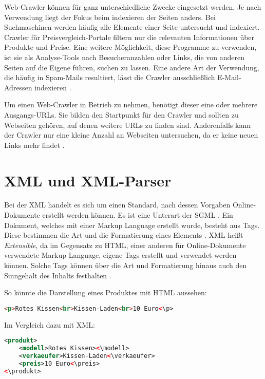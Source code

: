 Web-Crawler können für ganz unterschiedliche Zwecke eingesetzt werden. Je nach Verwendung liegt der Fokus beim indexieren der Seiten anders. Bei Suchmaschinen werden häufig alle Elemente einer Seite untersucht und indexiert. Crawler für Preisvergleich-Portale filtern nur die relevanten Informationen über Produkte und Preise. Eine weitere Möglichkeit, diese Programme zu verwenden, ist sie als Analyse-Tools nach Besucheranzahlen oder Links, die von anderen Seiten auf die Eigene führen, suchen zu lassen. Eine andere Art der Verwendung, die häufig in Spam-Mails resultiert, lässt die Crawler ausschließlich E-Mail-Adressen indexieren \cite{ryte}.

Um einen Web-Crawler in Betrieb zu nehmen, benötigt dieser eine oder mehrere Ausgangs-URLs. Sie bilden den Startpunkt für den Crawler und sollten zu Webseiten gehören, auf denen weitere URLs zu finden sind. Anderenfalls kann der Crawler nur eine kleine Anzahl an Webseiten untersuchen, da er keine neuen Links mehr findet \cite{how}. 


\newpage

\section{XML und XML-Parser}
Bei der \ac{XML} handelt es sich um einen Standard, nach dessen Vorgaben Online-Dokumente erstellt werden können. Es ist eine Unterart der \ac{SGML} \cite{xmldef}. Ein Dokument, welches mit einer Markup Language erstellt wurde, besteht aus Tags. Diese bestimmen die Art und die Formatierung eines Elements \cite{markup}. \ac{XML} heißt \textit{Extensible}, da im Gegensatz zu \ac{HTML}, einer anderen für Online-Dokumente verwendete Markup Language, eigene Tags erstellt und verwendet werden können. Solche Tags können über die Art und Formatierung hinaus auch den Sinngehalt des Inhalts festhalten \cite{xmldef}.

So könnte die Darstellung eines Produktes mit \acs{HTML} aussehen: \\
\begin{lstlisting}[title=Beispiel-Code HTML, language=HTML]
<p>Rotes Kissen<br>Kissen-Laden<br>10 Euro<\p>
\end{lstlisting}

Im Vergleich dazu mit \ac{XML}: \\

\begin{lstlisting}[title=Beispiel-Code XML, language=XML, morekeywords={produkt, modell, verkaeufer, preis}]
<produkt>
	<modell>Rotes Kissen><\modell>
	<verkaeufer>Kissen-Laden<\verkaeufer>
	<preis>10 Euro<\preis>
<\produkt>
\end{lstlisting}

